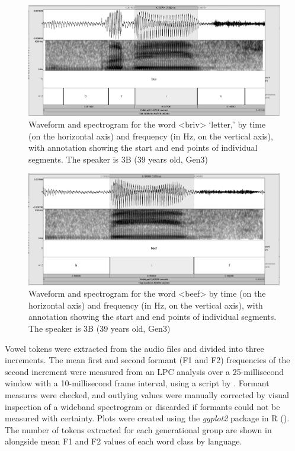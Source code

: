 \documentclass[output=paper]{langsci/langscibook}
\begin{document}
\begin{figure}
\includegraphics[width=\textwidth]{figures/nove-fig4-bw.png}
\caption{Waveform and spectrogram for the word <briv> ‘letter,’ by time (on the horizontal axis) and frequency (in Hz, on the vertical axis), with annotation showing the start and end points of individual segments. The speaker is 3B (39 years old, Gen3)}
\label{fig:nove:4}
\end{figure} 

 
  
 

 \begin{figure}
 \includegraphics[width=\textwidth]{figures/nove-fig5-bw.png}
\caption{Waveform and spectrogram for the word <beef> by time (on the horizontal axis) and frequency (in Hz, on the vertical axis), with annotation showing the start and end points of individual segments. The speaker is 3B (39 years old, Gen3)}
\label{fig:nove:5}
\end{figure} 

Vowel tokens were extracted from the audio files and divided into three increments. The mean first and second formant (F1 and F2) frequencies of the second increment were measured from an LPC analysis over a 25-millisecond window with a 10-millisecond frame interval, using a script by \citet{Kang2016}. Formant measures were checked, and outlying values were manually corrected by visual inspection of a wideband spectrogram or discarded if formants could not be measured with certainty. Plots were created using the \textit{ggplot2} package \citep{Wickham2009} in R (\citealt{RCore2017}). The number of tokens extracted for each generational group are shown in  alongside mean F1 and F2 values of each word class by language.
\end{document}

